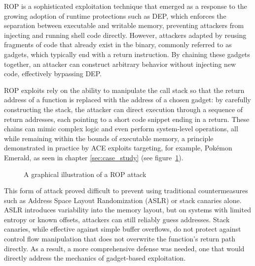 \documentclass[a4paper]{usiinfbachelorproject}
\begin{document}

ROP is a sophisticated exploitation technique that emerged as a response to the growing adoption of runtime protections such as DEP, which enforces the separation between executable and writable memory, preventing attackers from injecting and running shell code directly. However, attackers adapted by reusing fragments of code that already exist in the binary, commonly referred to as gadgets, which typically end with a return instruction. By chaining these gadgets together, an attacker can construct arbitrary behavior without injecting new code, effectively bypassing DEP.

ROP exploits rely on the ability to manipulate the call stack so that the return address of a function is replaced with the address of a chosen gadget: by carefully constructing the stack, the attacker can direct execution through a sequence of return addresses, each pointing to a short code snippet ending in a return. These chains can mimic complex logic and even perform system-level operations, all while remaining within the bounds of executable memory, a principle demonstrated in practice by ACE exploits targeting, for example, Pokémon Emerald, as seen in chapter \ref{sec:case_study} (see figure~\ref{fig:rop}).

\begin{figure}[h!]
	\caption{A graphical illustration of a ROP attack\label{fig:rop}}
\end{figure}

This form of attack proved difficult to prevent using traditional countermeasures such as Address Space Layout Randomization (ASLR)\cite{websrc5} or stack canaries alone. ASLR introduces variability into the memory layout, but on systems with limited entropy or known offsets, attackers can still reliably guess addresses. Stack canaries, while effective against simple buffer overflows, do not protect against control flow manipulation that does not overwrite the function's return path directly. As a result, a more comprehensive defense was needed, one that would directly address the mechanics of gadget-based exploitation.
\end{document}
